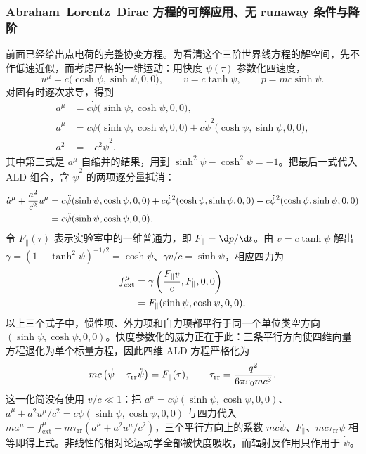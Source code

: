 \subsubsection{Abraham--Lorentz--Dirac 方程的可解应用、无 runaway 条件与降阶}

前面已经给出点电荷的完整协变方程。为看清这个三阶世界线方程的解空间，先不作低速近似，而考虑严格的一维运动：用快度 $\psi(\tau)$ 参数化四速度，
\begin{equation*}
 u^\mu=c\bigl(\cosh\psi,\sinh\psi,0,0\bigr),
 \qquad
 v=c\tanh\psi,
 \qquad
 p=mc\sinh\psi.
\end{equation*}
对固有时逐次求导，得到
\begin{align*}
 a^\mu
 &=c\dot\psi\bigl(\sinh\psi,\cosh\psi,0,0\bigr),\\
 \dot a^\mu
 &=c\ddot\psi\bigl(\sinh\psi,\cosh\psi,0,0\bigr)
 +c\dot\psi^2\bigl(\cosh\psi,\sinh\psi,0,0\bigr),\\
 a^2&=-c^2\dot\psi^2.
\end{align*}
其中第三式是 $a^\mu$ 自缩并的结果，用到 $\sinh^2\psi-\cosh^2\psi=-1$。把最后一式代入 ALD 组合，含 $\dot\psi^2$ 的两项逐分量抵消：
\begin{align*}
 \dot a^\mu+{a^2\over c^2}u^\mu
 &={}c\ddot\psi(\sinh\psi,\cosh\psi,0,0)
 +c\dot\psi^2(\cosh\psi,\sinh\psi,0,0)
 -c\dot\psi^2(\cosh\psi,\sinh\psi,0,0)\\
 &=c\ddot\psi(\sinh\psi,\cosh\psi,0,0).
\end{align*}
令 $F_\parallel(\tau)$ 表示实验室中的一维普通力，即 $F_\parallel=\d p/\d t$。由 $v=c\tanh\psi$ 解出 $\gamma=(1-\tanh^2\psi)^{-1/2}=\cosh\psi$、$\gamma v/c=\sinh\psi$，相应四力为
\begin{align*}
 f_{\mathrm{ext}}^\mu
 &=\gamma\left({F_\parallel v\over c},F_\parallel,0,0\right)\\
 &=F_\parallel(\sinh\psi,\cosh\psi,0,0).
\end{align*}
以上三个式子中，惯性项、外力项和自力项都平行于同一个单位类空方向 $(\sinh\psi,\cosh\psi,0,0)$。快度参数化的威力正在于此：三条平行方向使四维向量方程退化为单个标量方程，因此四维 ALD 方程严格化为
\begin{equation*}
 mc\left(\dot\psi-\tau_{\mathrm{rr}}\ddot\psi\right)
 =F_\parallel(\tau),
 \qquad
 \tau_{\mathrm{rr}}={q^2\over6\pi\varepsilon_0mc^3}.
\end{equation*}
这一化简没有使用 $v/c\ll1$：把 $a^\mu=c\dot\psi(\sinh\psi,\cosh\psi,0,0)$、$\dot a^\mu+a^2u^\mu/c^2=c\ddot\psi(\sinh\psi,\cosh\psi,0,0)$ 与四力代入 $ma^\mu=f_{\mathrm{ext}}^\mu+m\tau_{\mathrm{rr}}(\dot a^\mu+a^2u^\mu/c^2)$，三个平行方向上的系数 $mc\dot\psi$、$F_\parallel$、$mc\tau_{\mathrm{rr}}\ddot\psi$ 相等即得上式。非线性的相对论运动学全部被快度吸收，而辐射反作用只作用于 $\dot\psi$。


